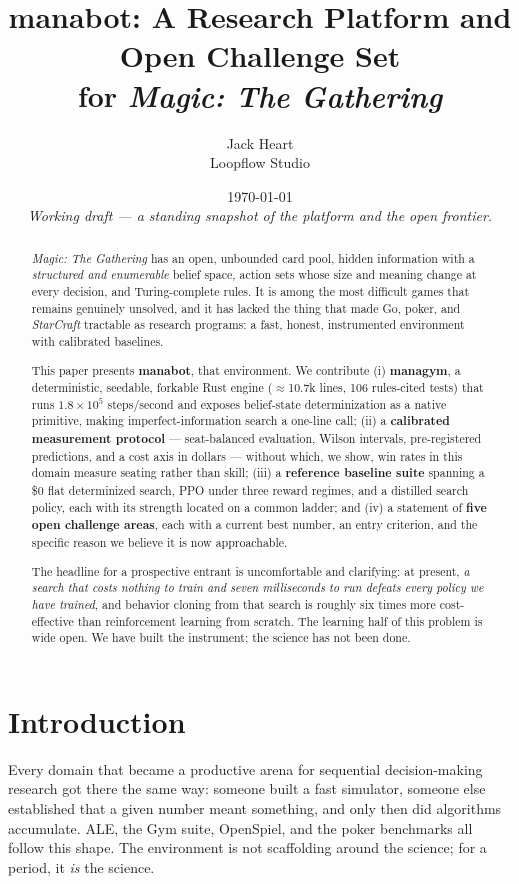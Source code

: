 \documentclass[11pt]{article}
\title{\textbf{manabot}: A Research Platform and Open Challenge Set\\ for \textit{Magic: The Gathering}}
\author{Jack Heart\\ \small Loopflow Studio}
\date{\today\\[0.5em]\small\textit{Working draft --- a standing snapshot of the platform and the open frontier.}}
\newcounter{challenge}
\begin{document}
\maketitle

\begin{abstract}
\textit{Magic: The Gathering} has an open, unbounded card pool, hidden information with a \emph{structured and enumerable} belief space, action sets whose size and meaning change at every decision, and Turing-complete rules. It is among the most difficult games that remains genuinely unsolved, and it has lacked the thing that made Go, poker, and \textit{StarCraft} tractable as research programs: a fast, honest, instrumented environment with calibrated baselines.

This paper presents \textbf{manabot}, that environment. We contribute (i) \textbf{managym}, a deterministic, seedable, forkable Rust engine ($\approx$10.7k lines, 106 rules-cited tests) that runs $1.8\times10^{5}$ steps/second and exposes belief-state determinization as a native primitive, making imperfect-information search a one-line call; (ii) a \textbf{calibrated measurement protocol} --- seat-balanced evaluation, Wilson intervals, pre-registered predictions, and a cost axis in dollars --- without which, we show, win rates in this domain measure seating rather than skill; (iii) a \textbf{reference baseline suite} spanning a \$0 flat determinized search, PPO under three reward regimes, and a distilled search policy, each with its strength located on a common ladder; and (iv) a statement of \textbf{five open challenge areas}, each with a current best number, an entry criterion, and the specific reason we believe it is now approachable.

The headline for a prospective entrant is uncomfortable and clarifying: at present, \emph{a search that costs nothing to train and seven milliseconds to run defeats every policy we have trained}, and behavior cloning from that search is roughly six times more cost-effective than reinforcement learning from scratch. The learning half of this problem is wide open. We have built the instrument; the science has not been done.
\end{abstract}

\section{Introduction}

Every domain that became a productive arena for sequential decision-making research got there the same way: someone built a fast simulator, someone else established that a given number meant something, and only then did algorithms accumulate. ALE, the Gym suite, OpenSpiel, and the poker benchmarks all follow this shape. The environment is not scaffolding around the science; for a period, it \emph{is} the science.
\end{document}
